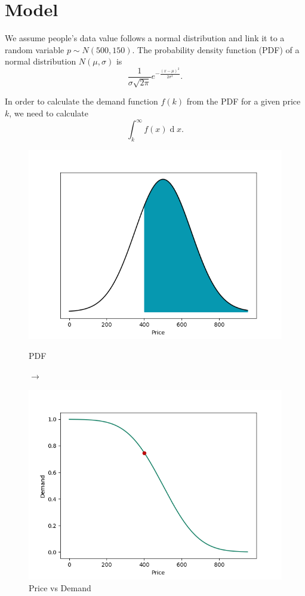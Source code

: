 \documentclass[11pt, a4paper]{article}
\theoremstyle{definition}
\begin{document}
	\section{Model}
		We assume people's data value follows a normal distribution and link it to a random variable $p\sim N(500, 150)$. The probability density function (PDF) of a normal distribution $N(\mu, \sigma)$ is $$\frac{1}{\sigma\sqrt{2\pi}}e^{-\frac{(x-\mu)^{2}}{2\sigma^{2}}}.$$\par\noindent
		In order to calculate the demand function $f(k)$ from the PDF for a given price $k$, we need to calculate
		$$\int_{k}^{\infty}f(x)\operatorname{d} x.$$
		\begin{figure}[H]
			\begin{minipage}{0.48\textwidth}
				\centering
				\includegraphics[width=\linewidth]{ND_integral}
				\caption{PDF}\label{Fig:Data1}
			\end{minipage}$\longrightarrow$
			\begin{minipage}{0.48\textwidth}
				\centering
				\includegraphics[width=\linewidth]{Sample_point}
				\caption{Price vs Demand}\label{Fig:Data2}
			\end{minipage}
		\end{figure}\par\noindent
\end{document}
